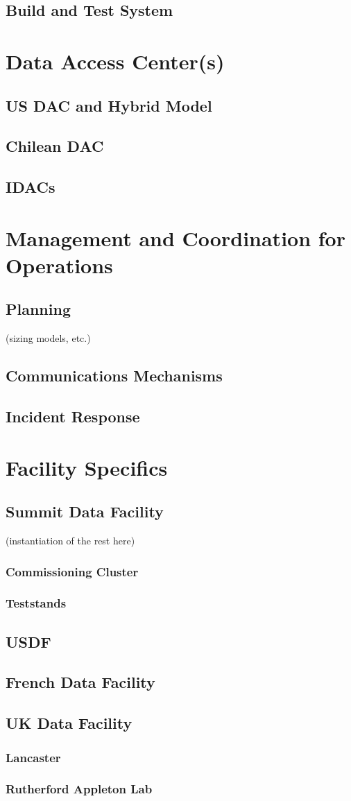 	\subsection{Build and Test System}
\section{Data Access Center(s)}
	\subsection{US DAC and Hybrid Model}
	\subsection{Chilean DAC}
	\subsection{IDACs}
\section{Management and Coordination for Operations}
	\subsection{Planning}
	(sizing models, etc.)
	\subsection{Communications Mechanisms}
	\subsection{Incident Response}
\section{Facility Specifics}
	\subsection{Summit Data Facility}
	(instantiation of the rest here)
            \subsubsection{Commissioning Cluster}
            \subsubsection{Teststands}
	\subsection{USDF}
	\subsection{French Data Facility}
	\subsection{UK Data Facility}
	    \subsubsection{Lancaster}
	    \subsubsection{Rutherford Appleton Lab}

\clearpage
